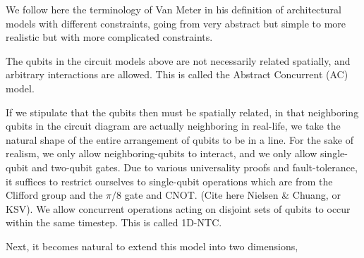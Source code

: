 We follow here the terminology of Van Meter \cite{VanMeter2006} in his
definition of architectural models with different constraints, going from
very abstract but simple to more realistic but with more complicated constraints.

The qubits in the circuit models above are not
necessarily related spatially, and arbitrary interactions are allowed.
This is called the Abstract Concurrent (\textsc{AC}) model.

If we stipulate that the qubits then must be spatially related, in that
neighboring qubits in the circuit diagram are actually neighboring in real-life,
we take the natural shape of the entire arrangement of qubits to be in a line.
For the sake of realism, we only allow neighboring-qubits to interact, and we
only allow single-qubit and two-qubit gates. Due to various universality
proofs and fault-tolerance, it suffices to restrict ourselves to single-qubit
operations which are from the Clifford group and the $\pi/8$ gate and CNOT.
(Cite here Nielsen & Chuang, or KSV). We allow concurrent operations
acting on disjoint sets of qubits to occur within the same timestep.
This is called \textsc{1D-NTC}.

Next, it becomes natural to extend this model into two dimensions,
